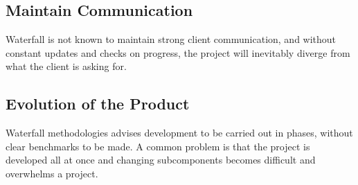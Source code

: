 \documentclass[11pt]{article}
\begin{document}
\subsection{Maintain Communication}
Waterfall is not known to maintain strong client communication, and without constant updates and checks on progress,
the project will inevitably diverge from what the client is asking for.

\subsection{Evolution of the Product}
Waterfall methodologies advises development to be carried out in phases, without clear benchmarks to be made. A common problem
is that the project is developed all at once and changing subcomponents becomes difficult and overwhelms a project.

\nocite{*}



\end{document}
